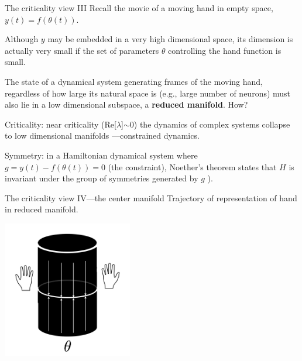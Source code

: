   \begin{frame}[label=ladila]{The criticality view III}
  Recall the movie of a moving hand in empty space, $y(t) = f(\theta(t))$. %
  \vfill
  
  Although $y$ may be embedded in a very high dimensional space, its dimension is actually very small if the set of parameters $\theta$ controlling the hand function is small.\vfill
  
The state of a dynamical system generating frames of the moving hand, regardless of how large its natural space is  (e.g.,   large number of neurons) must also lie in a low dimensional subspace, a {\bf reduced manifold}. How?  \vfill
  
   Criticality: near criticality (Re[$\lambda$]$\sim0$) the dynamics of complex systems collapse to low dimensional manifolds   \citep{Jirsa2020,Jirsa2022}---constrained dynamics. \vfill
   
   Symmetry: in a Hamiltonian dynamical system where $g = y(t)-f(\theta(t)) = 0$  (the constraint),  Noether's theorem states that  $H$ is invariant under the group of symmetries generated by $g$  \citep{Dirac2001-gi,Jose1998-qy}). 

\end{frame}

\begin{frame}[label=ladila]{The criticality view IV---the center manifold}
Trajectory of representation of hand in reduced manifold. 
 \begin{center}
  \includegraphics[height=6cm]{img/cylinder.png}
  \end{center}


\end{frame}



